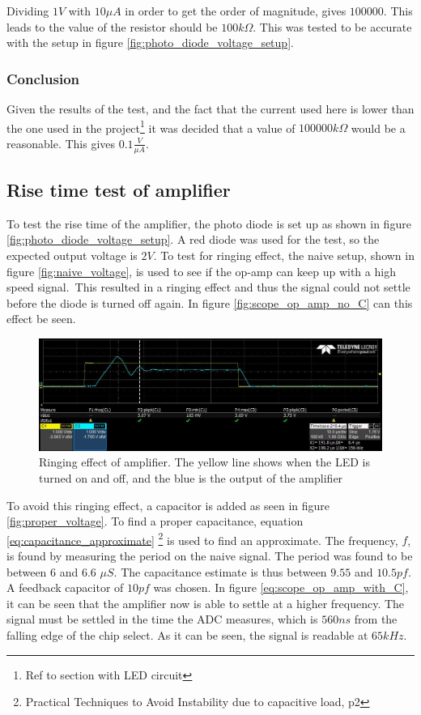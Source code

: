 Dividing $1 V$ with $10 \mu A$ in order to get the order of magnitude, gives $100 000$. This leads to the value of the resistor should be $100 k\Omega$.
This was tested to be accurate with the setup in figure \ref{fig:photo_diode_voltage_setup}.


\subsubsection{Conclusion}
Given the results of the test, and the fact that the current used here is lower than the one used in the project\footnote{Ref to section with LED circuit} it was decided that a value of $100 000 k\Omega$ would be a reasonable. This gives $0.1 \frac{V}{\mu A}$.

\subsection{Rise time test of amplifier} \label{sec:rise_time_test}

To test the rise time of the amplifier, the photo diode is set up as shown in figure \ref{fig:photo_diode_voltage_setup}.
A red diode was used for the test, so the expected output voltage is $2 V$.
To test for ringing effect, the naive setup, shown in figure \ref{fig:naive_voltage}, 
is used to see if the op-amp can keep up with a high speed signal.\
This resulted in a ringing effect and thus the signal could not settle before the diode is turned off again.
In figure \ref{fig:scope_op_amp_no_C} can this effect be seen.

\begin{figure}[h]
\includegraphics{img/amp_test_ringing2.jpg}
\caption{Ringing effect of amplifier. The yellow line shows when the LED is turned on and off, and the blue is the output of the amplifier}
\label{fig::scope_op_amp_no_C}
\end{figure}

To avoid this ringing effect, a capacitor is added as seen in figure \ref{fig:proper_voltage}.
To find a proper capacitance, equation \ref{eq:capacitance_approximate}
\footnote{Practical Techniques to Avoid Instability due to capacitive load, p2}
is used to find an approximate.
The frequency, $f$, is found by measuring the period on the naive signal.
The period was found to be between $6$ and $6.6$ $\mu S$.
The capacitance estimate is thus between $9.55$ and $10.5 pf$. 
A feedback capacitor of $10 pf$ was chosen.
In figure \ref{eq:scope_op_amp_with_C}, it can be seen that the amplifier now is able to settle at a higher frequency.
The signal must be settled in the time the ADC measures, which is $560 ns$ from the falling edge of the chip select.
As it can be seen, the signal is readable at $65 kHz$.

